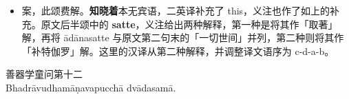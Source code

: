 \begin{itemize}\item 案，此颂费解。\textbf{知晓着}本无宾语，二英译补充了 this，义注也作了如上的补充。原文后半颂中的 \textbf{satte}，义注给出两种解释，第一种是将其作「取著」解，再将 ādānasatte 与原文第二句末的「一切世间」并列，第二种则将其作「补特伽罗」解。这里的汉译从第二种解释，并调整译文语序为 c-d-a-b。\end{itemize}

\begin{center}\vspace{1em}善器学童问第十二\\Bhadrāvudhamāṇavapucchā dvādasamā.\end{center}